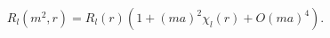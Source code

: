 \begin{equation}
\label{Eq_0228}
R_l(m^2,r) = R_l(r) (1 + (ma)^2 \chi_l(r) + O(ma)^4).
\end{equation}

